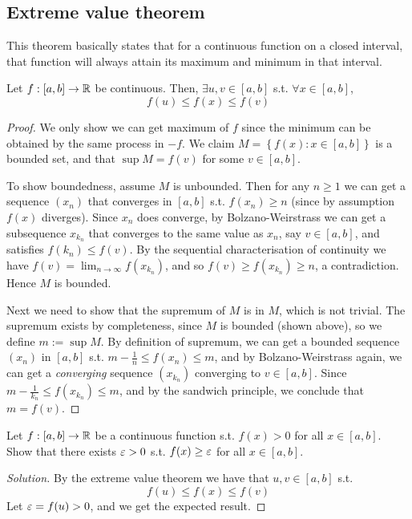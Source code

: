 \subsection{Extreme value theorem}
This theorem basically states that for a continuous function on a closed interval, that
function will always attain its maximum and minimum in that interval. 
\begin{theorem}
  Let $f:[a,b]\to\mathbb R$ be continuous. Then, $\exists u,v\in [a,b]$ s.t. $\forall
  x\in[a,b]$,
  \[f(u)\leq f(x)\leq f(v)\]

  \label{evt}
\end{theorem}
\begin{proof}
  We only show we can get maximum of $f$ since the minimum can be obtained by the same
  process in $-f$. We claim $M=\left\{ f(x) : x\in [a,b] \right\}$ is a bounded set, and
  that $\sup M=f(v)$ for some $v\in [a,b]$.
  
  To show boundedness, assume $M$ is unbounded. Then for any $n\geq 1$ we can get a
  sequence $(x_n)$ that converges in $[a,b]$ s.t. $f(x_n)\geq n$ (since by assumption
  $f(x)$ diverges). Since $x_n$ does converge, by Bolzano-Weirstrass we can get a
  subsequence $x_{k_n}$ that converges to the same value as $x_n$, say $v\in [a,b]$, and
  satisfies $f(k_n)\leq f(v)$. By the sequential characterisation of continuity we have
  $f(v)=\lim_{n\to\infty} f(x_{k_n})$, and so $f(v)\geq f(x_{k_n})\geq n$, a
  contradiction. Hence $M$ is bounded. 

  Next we need to show that the supremum of $M$ is in $M$, which is not trivial. The
  supremum exists by completeness, since $M$ is bounded (shown above), so we define
  $m:=\sup M$. By definition of supremum, we can get a bounded sequence $(x_n)$ in
  $[a,b]$ s.t. $m-\frac{1}{n}\leq f(x_n)\leq m$, and by Bolzano-Weirstrass again, we can
  get a \emph{converging} sequence $(x_{k_n})$ converging to $v\in[a,b]$. Since
  $m-\frac{1}{k_n} \leq f(x_{k_n}) \leq m$, and by the sandwich principle, we conclude
  that $m=f(v)$.
\end{proof}
\begin{example}
  Let $f:[a,b]\to\mathbb R$ be a continuous function s.t. $f(x)>0$ for all $x\in[a,b]$. Show
  that there exists $\varepsilon >0$ s.t. $f(x)\geq \varepsilon$ for all $x\in[a,b]$.
\end{example}
\begin{proof}[Solution]
  By the extreme value theorem we have that $u,v\in[a,b]$ s.t. 
  \[f(u)\leq f(x) \leq f(v)\]
  Let $\varepsilon=f(u)>0$, and we get the expected result.
\end{proof}



